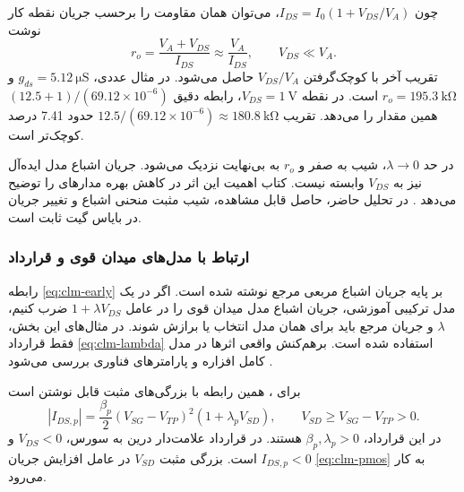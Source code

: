 چون \(I_{DS}=I_0(1+V_{DS}/V_A)\)، می‌توان همان مقاومت را برحسب جریان
نقطه کار نوشت
\begin{equation}
 r_o=\frac{V_A+V_{DS}}{I_{DS}}
 \approx\frac{V_A}{I_{DS}},\qquad V_{DS}\ll V_A.
 \label{eq:output-resistance-current}
\end{equation}
تقریب آخر با کوچک‌گرفتن \(V_{DS}/V_A\) حاصل می‌شود. در مثال عددی،
\(g_{ds}=\qty{5.12}{\micro\siemens}\) و
\(r_o=\qty{195.3}{\kilo\ohm}\) است. در نقطه
\(V_{DS}=\qty{1}{\volt}\)، رابطه دقیق
\((12.5+1)/(69.12\times10^{-6})\) همین مقدار را می‌دهد. تقریب
\(12.5/(69.12\times10^{-6})\approx\qty{180.8}{\kilo\ohm}\) حدود
\num{7.41} درصد کوچک‌تر است.

در حد \(\lambda\to0\)، شیب به صفر و \(r_o\) به بی‌نهایت نزدیک
می‌شود. جریان اشباع مدل ایده‌آل نیز به \(V_{DS}\) وابسته نیست.
کتاب اهمیت این اثر در کاهش بهره مدارهای  را توضیح می‌دهد
\cite[بخش ]{weste}. در تحلیل حاضر، حاصل قابل مشاهده،
شیب مثبت منحنی اشباع و تغییر جریان در بایاس گیت ثابت است.

\subsubsection*{ارتباط با مدل‌های میدان قوی و قرارداد }
رابطه \eqref{eq:clm-early} بر پایه جریان اشباع مربعی مرجع نوشته شده است.
اگر در یک مدل ترکیبی آموزشی، جریان اشباع مدل میدان قوی را در عامل
\(1+\lambda V_{DS}\) ضرب کنیم، \(\lambda\) و جریان مرجع باید برای همان
مدل انتخاب یا برازش شوند. در مثال‌های این بخش، فقط قرارداد
\eqref{eq:clm-lambda} استفاده شده است. برهم‌کنش واقعی اثرها در مدل کامل
افزاره و پارامترهای فناوری بررسی می‌شود \cite[صفحات چاپی ۷۵ و ۷۸]{weste}.

برای ، همین رابطه با بزرگی‌های مثبت قابل نوشتن است
\begin{equation}
 |I_{DS,p}|=\frac{\beta_p}{2}(V_{SG}-V_{TP})^2
 (1+\lambda_p V_{SD}),\qquad
 V_{SD}\ge V_{SG}-V_{TP}>0.
 \label{eq:clm-pmos}
\end{equation}
در این قرارداد، \(\beta_p,\lambda_p>0\) هستند. در قرارداد علامت‌دار
درین به سورس، \(V_{DS}<0\) و \(I_{DS,p}<0\) است. بزرگی مثبت
\(V_{SD}\) در عامل افزایش جریان \eqref{eq:clm-pmos} به کار می‌رود.
